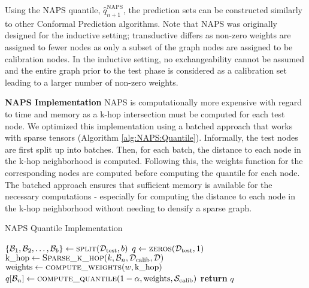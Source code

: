 Using the NAPS quantile, $\hat{q}^{\text{NAPS}}_{n+1}$, the prediction sets can be constructed similarly to other Conformal Prediction algorithms.
Note that NAPS was originally designed for the inductive setting; transductive differs as non-zero weights are assigned to fewer nodes as only a subset of the graph nodes are assigned to be calibration nodes.
In the inductive setting, no exchangeability cannot be assumed and the entire graph prior to the test phase is considered as a calibration set leading to a larger number of non-zero weights.

\noindent \textbf{NAPS Implementation}
NAPS is computationally more expensive with regard to time and memory as a k-hop intersection must be computed for each test node.
We optimized this implementation using a batched approach that works with sparse tensors (Algorithm \ref{alg:NAPS:Quantile}).
Informally, the test nodes are first split up into batches. 
Then, for each batch, the distance to each node in the k-hop neighborhood is computed.
Following this, the weights function for the corresponding nodes are computed before computing the quantile for each node.
The batched approach ensures that sufficient memory is available for the necessary computations - especially for computing the distance to each node in the k-hop neighborhood without needing to densify a sparse graph.

\begin{algorithm}
\caption{NAPS Quantile Implementation}\label{alg:NAPS:Quantile}
\begin{algorithmic}[1]
    \State $\{\mathcal{B}_1,\mathcal{B}_2,\hdots,\mathcal{B}_b\}\gets \Call{\text{split}}{\test,b}$ 
    \State $q\gets \Call{\text{zeros}}{\test,1}$
        \State $\text{k\_hop} \gets \Call{\text{Sparse\_k\_hop}}{k,\mathcal{B}_n,\calib,\mathcal{D}}$
        \State $\text{weights}\gets \Call{\text{compute\_weights}}{w,\text{k\_hop}}$
        \State $q[\mathcal{B}_n]\gets \Call{\text{compute\_quantile}}{1-\alpha,\text{weights},\mathcal{S}_{\text{calib}}}$
    \EndFor\label{NAPSquantileendwhile}
    \State \textbf{return} $q$
\EndProcedure
\end{algorithmic}
\end{algorithm}

